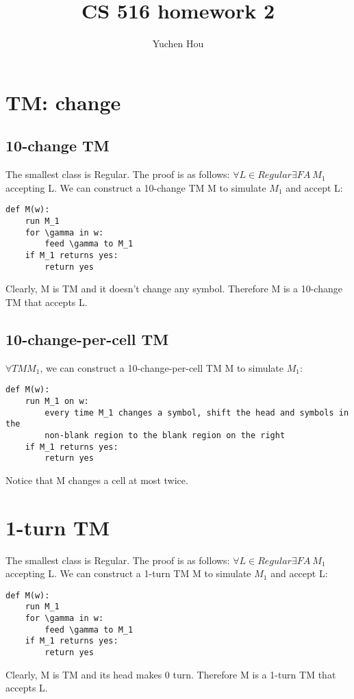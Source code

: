 \documentclass{article}
\begin{document}
\lstset{language=python, tabsize=4}
\title{CS 516 homework 2}
\author{Yuchen Hou}
\maketitle

\section{TM: change}

\subsection{10-change TM}

The smallest class is Regular. The proof is as follows:
$ \forall L \in Regular \exists FA \ M_1 $ accepting L. We can construct a 10-change TM M to simulate $ M_1 $ and accept L:
\begin{lstlisting}
def M(w):
	run M_1
	for \gamma in w:
		feed \gamma to M_1
	if M_1 returns yes:
		return yes
\end{lstlisting}
Clearly, M is TM and it doesn't change any symbol. Therefore M is a 10-change TM that accepts L.

\subsection{10-change-per-cell TM}

$ \forall TM M_1 $, we can construct a 10-change-per-cell TM M to simulate $ M_1 $:
\begin{lstlisting}
def M(w):
	run M_1 on w:
		every time M_1 changes a symbol, shift the head and symbols in the
		non-blank region to the blank region on the right
	if M_1 returns yes:
		return yes
\end{lstlisting}
Notice that M changes a cell at most twice.

\section{1-turn TM}

The smallest class is Regular. The proof is as follows:
$ \forall L \in Regular \exists FA \ M_1$ accepting L. We can construct a 1-turn TM M to simulate $ M_1 $ and accept L:
\begin{lstlisting}
def M(w):
	run M_1
	for \gamma in w:
		feed \gamma to M_1
	if M_1 returns yes:
		return yes
\end{lstlisting}
Clearly, M is TM and its head makes 0 turn. Therefore M is a 1-turn TM that accepts L.
\end{document}
